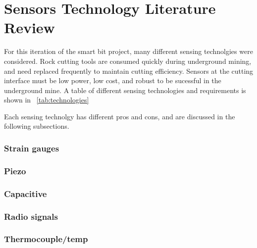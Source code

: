 \chapter{Sensors Technology Literature Review\label{chap:3}}

For this iteration of the smart bit project, many different sensing technolgies were considered.
Rock cutting tools are consumed quickly during underground mining, and need replaced frequently
to maintain cutting efficiency. 
Sensors at the cutting interface must be low power, low cost, and robust 
to be sucessful in the underground mine.
A table of different sensing technologies and requirements is shown in ~\ref{tab:technologies}

Each sensing technolgy has different pros and cons, and are discussed in the following subsections.

\subsection{Strain gauges}

\subsection{Piezo}

\subsection{Capacitive}

\subsection{Radio signals}

\subsection{Thermocouple/temp}


